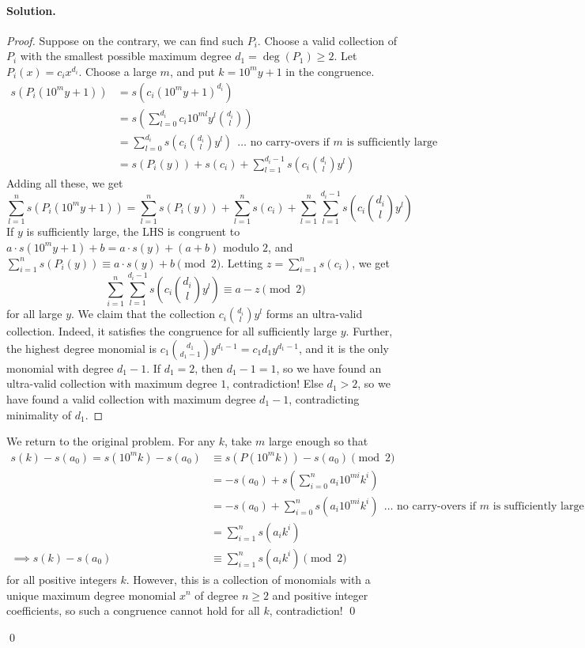 \documentclass[12pt]{article}
\newenvironment{solution}
{\paragraph{Solution.}}
{\qed\eject}
\begin{document}
\begin{solution}
\begin{proof}
    Suppose on the contrary, we can find such $P_i$. Choose a valid collection of $P_i$ with the smallest possible maximum degree $d_1=\deg(P_1) \geq 2$. Let $P_i(x)=c_ix^{d_i}$. Choose a large $m$, and put $k=10^my+1$ in the congruence.
    \begin{align*}
        s(P_i(10^my+1)) &= s(c_i(10^my+1)^{d_i}) \\
        &= s\left(\sum_{l=0}^{d_i} c_i 10^{ml} y^l \binom{d_i}{l}\right) \\
        &= \sum_{l=0}^{d_i} s\left(c_i \binom{d_i}{l} y^l\right) \ \ \dots \text{ no carry-overs if }m \text{ is sufficiently large} \\
        &= s(P_i(y)) + s(c_i) + \sum_{l=1}^{d_i-1} s\left(c_i \binom{d_i}{l} y^l\right)
    \end{align*}
    Adding all these, we get
    $$\sum_{l=1}^n s(P_i(10^my+1)) = \sum_{l=1}^n s(P_i(y))+\sum_{l=1}^n s(c_i) + \sum_{l=1}^n \sum_{l=1}^{d_i-1} s\left(c_i \binom{d_i}{l} y^l\right)$$
    If $y$ is sufficiently large, the LHS is congruent to $a \cdot s(10^my+1)+b = a\cdot s(y)+(a+b)$ modulo $2$, and $\sum_{i=1}^n s(P_i(y)) \equiv a \cdot s(y)+b \pmod 2$. Letting $z=\sum_{i=1}^n s(c_i)$, we get
    $$\sum_{i=1}^n \sum_{l=1}^{d_i-1} s\left(c_i \binom{d_i}{l} y^l\right) \equiv a-z \pmod 2$$
    for all large $y$. We claim that the collection $c_i \binom{d_i}{l} y^l$ forms an ultra-valid collection. Indeed, it satisfies the congruence for all sufficiently large $y$. Further, the highest degree monomial is $c_1 \binom{d_1}{d_1-1} y^{d_1-1}=c_1d_1y^{d_1-1}$, and it is the only monomial with degree $d_1-1$. If $d_1=2$, then $d_1-1=1$, so we have found an ultra-valid collection with maximum degree $1$, contradiction! Else $d_1>2$, so we have found a valid collection with maximum degree $d_1-1$, contradicting minimality of $d_1$.
\end{proof}

We return to the original problem. For any $k$, take $m$ large enough so that
\begin{align*}
    s(k)-s(a_0)=s(10^mk)-s(a_0) &\equiv s(P(10^mk)) -s(a_0) \pmod 2 \\
    &= -s(a_0)+s\left(\sum_{i=0}^n a_i 10^{mi} k^i \right) \\
    &= -s(a_0)+\sum_{i=0}^n s(a_i10^{mi}k^i) \ \ \dots \text{ no carry-overs if }m \text{ is sufficiently large} \\
    &=\sum_{i=1}^n s(a_ik^i) \\
    \implies s(k)-s(a_0) &\equiv \sum_{i=1}^n s(a_ik^i) \pmod 2
\end{align*}
for all positive integers $k$. However, this is a collection of monomials with a unique maximum degree monomial $x^n$ of degree $n \geq 2$ and positive integer coefficients, so such a congruence cannot hold for all $k$, contradiction! \qed


\end{solution}
\end{document}
